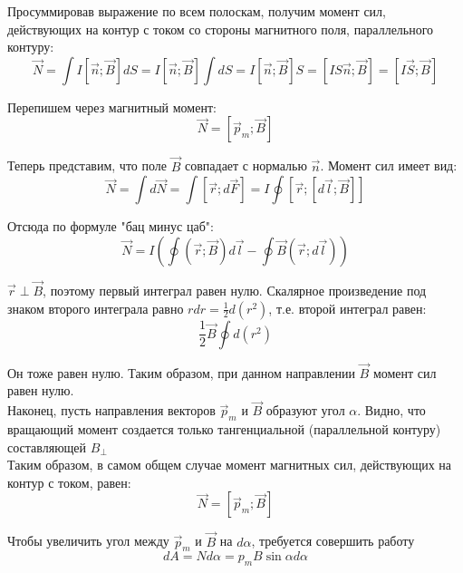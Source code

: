 \documentclass{article}
\begin{document}
	Просуммировав выражение по всем полоскам, получим момент сил, действующих на контур с током со стороны магнитного поля, параллельного контуру:
	\begin{equation}
		\vec N = \int I[\vec n;\vec B]dS = I[\vec n;\vec B]\int dS = I[\vec n;\vec B]S = [IS\vec n; \vec B] = [I\vec S;\vec B]
	\end{equation}

	Перепишем через магнитный момент:
	\begin{equation}
		\vec N = [\vec p_m;\vec B]
	\end{equation}

	Теперь представим, что поле $\vec B$ совпадает с нормалью $\vec n$. Момент сил имеет вид:
	\begin{equation}
		\vec N = \int d\vec N = \int [\vec r;d\vec F] = I\oint[\vec r;[d\vec l;\vec B]]
	\end{equation}

	Отсюда по формуле "бац минус цаб":
	\begin{equation}
		\vec N = I(\oint (\vec r;\vec B)d\vec l - \oint \vec B(\vec r;d\vec l))
	\end{equation}

	$\vec r\perp \vec B$, поэтому первый интеграл равен нулю. Скалярное произведение под знаком второго интеграла равно $rdr = \frac{1}{2}d(r^2)$, т.е. второй интеграл равен:
	\begin{equation}
		\frac{1}{2}\vec B \oint d(r^2)
	\end{equation}

	Он тоже равен нулю. Таким образом, при данном направлении $\vec B$ момент сил равен нулю.\\

	Наконец, пусть направления векторов $\vec p_m$ и $\vec B$ образуют угол $\alpha$. Видно, что вращающий момент создается только тангенциальной (параллельной контуру) составляющей $B_\perp$\\

	Таким образом, в самом общем случае момент магнитных сил, действующих на контур с током, равен:
	\begin{equation}
		\vec N = [\vec p_m;\vec B]
	\end{equation}

	Чтобы увеличить угол между $\vec p_m$ и $\vec B$ на $d\alpha$, требуется совершить работу
	\begin{equation}
		dA = Nd\alpha = p_m B \sin\alpha d\alpha
	\end{equation}
\end{document}
